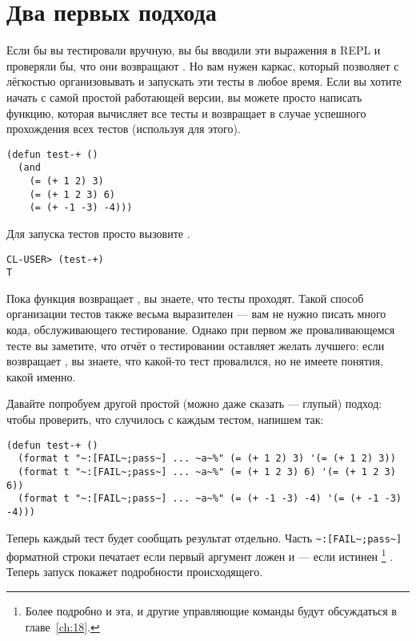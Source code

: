 \section{Два первых подхода}

Если бы вы тестировали вручную, вы бы вводили эти выражения в REPL и проверяли бы, что они
возвращают . Но вам нужен каркас, который позволяет с лёгкостью организовывать и
запускать эти тесты в любое время. Если вы хотите начать с самой простой работающей
версии, вы можете просто написать функцию, которая вычисляет все тесты и возвращает
 в случае успешного прохождения всех тестов (используя  для этого).

\begin{lstlisting}
(defun test-+ ()
  (and
    (= (+ 1 2) 3)
    (= (+ 1 2 3) 6)
    (= (+ -1 -3) -4)))
\end{lstlisting}

Для запуска тестов просто вызовите .

\begin{lstlisting}
CL-USER> (test-+)
T
\end{lstlisting}

Пока функция возвращает , вы знаете, что тесты проходят. Такой способ организации
тестов также весьма выразителен --- вам не нужно писать много кода, обслуживающего
тестирование. Однако при первом же проваливающемся тесте вы заметите, что отчёт о
тестировании оставляет желать лучшего: если  возвращает , вы
знаете, что какой-то тест провалился, но не имеете понятия, какой именно.

Давайте попробуем другой простой (можно даже сказать --- глупый) подход: чтобы проверить,
что случилось с каждым тестом, напишем так:

\begin{lstlisting}
(defun test-+ ()
  (format t "~:[FAIL~;pass~] ... ~a~%" (= (+ 1 2) 3) '(= (+ 1 2) 3))
  (format t "~:[FAIL~;pass~] ... ~a~%" (= (+ 1 2 3) 6) '(= (+ 1 2 3) 6))
  (format t "~:[FAIL~;pass~] ... ~a~%" (= (+ -1 -3) -4) '(= (+ -1 -3) -4)))
\end{lstlisting}

Теперь каждый тест будет сообщать результат отдельно. Часть \lstinline!~:[FAIL~;pass~]!
форматной строки  печатает  если первый аргумент ложен и
 --- если истинен \footnote{Более подробно и эта, и другие управляющие команды
   будут обсуждаться в главе~\ref{ch:18}.} . Теперь запуск 
покажет подробности происходящего.

